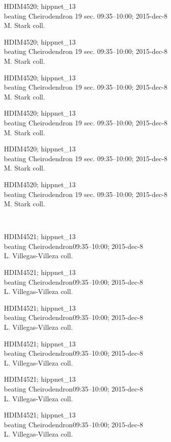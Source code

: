 \documentclass[2pt]{extarticle}
\begin{document}
\noindent
\parbox{0.16\textwidth}{\tiny \raggedright \rule[-0.3\baselineskip]{0pt}{10pt}HDIM4520; hippnet\_13\\ beating Cheirodendron 19 sec. 09:35--10:00; 2015-dec-8\\ M. Stark coll.}
\parbox{0.16\textwidth}{\tiny \raggedright \rule[-0.3\baselineskip]{0pt}{10pt}HDIM4520; hippnet\_13\\ beating Cheirodendron 19 sec. 09:35--10:00; 2015-dec-8\\ M. Stark coll.}
\parbox{0.16\textwidth}{\tiny \raggedright \rule[-0.3\baselineskip]{0pt}{10pt}HDIM4520; hippnet\_13\\ beating Cheirodendron 19 sec. 09:35--10:00; 2015-dec-8\\ M. Stark coll.}
\parbox{0.16\textwidth}{\tiny \raggedright \rule[-0.3\baselineskip]{0pt}{10pt}HDIM4520; hippnet\_13\\ beating Cheirodendron 19 sec. 09:35--10:00; 2015-dec-8\\ M. Stark coll.}
\parbox{0.16\textwidth}{\tiny \raggedright \rule[-0.3\baselineskip]{0pt}{10pt}HDIM4520; hippnet\_13\\ beating Cheirodendron 19 sec. 09:35--10:00; 2015-dec-8\\ M. Stark coll.}
\parbox{0.16\textwidth}{\tiny \raggedright \rule[-0.3\baselineskip]{0pt}{10pt}HDIM4520; hippnet\_13\\ beating Cheirodendron 19 sec. 09:35--10:00; 2015-dec-8\\ M. Stark coll.} \\ 
\vspace{0.001in} 

\noindent
\parbox{0.16\textwidth}{\tiny \raggedright \rule[-0.3\baselineskip]{0pt}{10pt}HDIM4521; hippnet\_13\\ beating Cheirodendron09:35--10:00; 2015-dec-8\\ L. Villegas-Villeza coll.}
\parbox{0.16\textwidth}{\tiny \raggedright \rule[-0.3\baselineskip]{0pt}{10pt}HDIM4521; hippnet\_13\\ beating Cheirodendron09:35--10:00; 2015-dec-8\\ L. Villegas-Villeza coll.}
\parbox{0.16\textwidth}{\tiny \raggedright \rule[-0.3\baselineskip]{0pt}{10pt}HDIM4521; hippnet\_13\\ beating Cheirodendron09:35--10:00; 2015-dec-8\\ L. Villegas-Villeza coll.}
\parbox{0.16\textwidth}{\tiny \raggedright \rule[-0.3\baselineskip]{0pt}{10pt}HDIM4521; hippnet\_13\\ beating Cheirodendron09:35--10:00; 2015-dec-8\\ L. Villegas-Villeza coll.}
\parbox{0.16\textwidth}{\tiny \raggedright \rule[-0.3\baselineskip]{0pt}{10pt}HDIM4521; hippnet\_13\\ beating Cheirodendron09:35--10:00; 2015-dec-8\\ L. Villegas-Villeza coll.}
\parbox{0.16\textwidth}{\tiny \raggedright \rule[-0.3\baselineskip]{0pt}{10pt}HDIM4521; hippnet\_13\\ beating Cheirodendron09:35--10:00; 2015-dec-8\\ L. Villegas-Villeza coll.} \\ 
\vspace{0.001in} 
\end{document}
